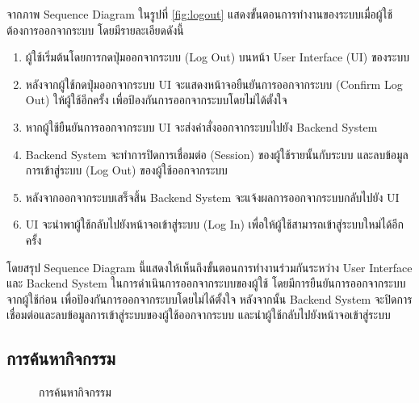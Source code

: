 \documentclass[14pt,oneside,openright,a4paper]{cpe-thai-project}
\begin{document}
  จากภาพ Sequence Diagram ในรูปที่ \ref{fig:logout} แสดงขั้นตอนการทำงานของระบบเมื่อผู้ใช้ต้องการออกจากระบบ โดยมีรายละเอียดดังนี้
  \begin{enumerate}
    \item ผู้ใช้เริ่มต้นโดยการกดปุ่มออกจากระบบ (Log Out) บนหน้า User Interface (UI) ของระบบ
    \item หลังจากผู้ใช้กดปุ่มออกจากระบบ UI จะแสดงหน้าจอยืนยันการออกจากระบบ (Confirm Log Out) ให้ผู้ใช้อีกครั้ง เพื่อป้องกันการออกจากระบบโดยไม่ได้ตั้งใจ
    \item หากผู้ใช้ยืนยันการออกจากระบบ UI จะส่งคำสั่งออกจากระบบไปยัง Backend System
    \item Backend System จะทำการปิดการเชื่อมต่อ (Session) ของผู้ใช้รายนั้นกับระบบ และลบข้อมูลการเข้าสู่ระบบ (Log Out) ของผู้ใช้ออกจากระบบ
    \item หลังจากออกจากระบบเสร็จสิ้น Backend System จะแจ้งผลการออกจากระบบกลับไปยัง UI
    \item UI จะนำพาผู้ใช้กลับไปยังหน้าจอเข้าสู่ระบบ (Log In) เพื่อให้ผู้ใช้สามารถเข้าสู่ระบบใหม่ได้อีกครั้ง
  \end{enumerate}
  โดยสรุป Sequence Diagram นี้แสดงให้เห็นถึงขั้นตอนการทำงานร่วมกันระหว่าง User Interface และ Backend System ในการดำเนินการออกจากระบบของผู้ใช้ โดยมีการยืนยันการออกจากระบบจากผู้ใช้ก่อน เพื่อป้องกันการออกจากระบบโดยไม่ได้ตั้งใจ หลังจากนั้น Backend System จะปิดการเชื่อมต่อและลบข้อมูลการเข้าสู่ระบบของผู้ใช้ออกจากระบบ และนำผู้ใช้กลับไปยังหน้าจอเข้าสู่ระบบ

\newpage

\subsection{การค้นหากิจกรรม}

  \begin{figure}[!h]\centering
    \setlength{\fboxrule}{0.5mm} %
    \setlength{\fboxsep}{0.5cm}
    \caption{การค้นหากิจกรรม}\label{fig:Search Event}
  \end{figure}
\end{document}
